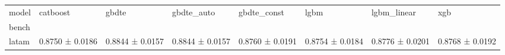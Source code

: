 \begin{tabular}{llllllll}
\toprule
model & catboost & gbdte & gbdte_auto & gbdte_const & lgbm & lgbm_linear & xgb \\
bench &  &  &  &  &  &  &  \\
\midrule
latam & 0.8750 ± 0.0186 & 0.8844 ± 0.0157 & 0.8844 ± 0.0157 & 0.8760 ± 0.0191 & 0.8754 ± 0.0184 & 0.8776 ± 0.0201 & 0.8768 ± 0.0192 \\
\bottomrule
\end{tabular}
